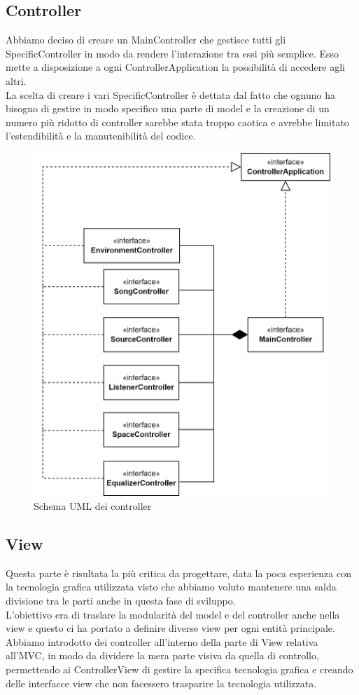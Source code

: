 \documentclass[a4paper,12pt]{report}
\begin{document}
\subsection*{Controller}
Abbiamo deciso di creare un MainController che gestisce tutti gli SpecificController in modo da rendere l'interazione tra essi più semplice. Esso mette a disposizione a ogni ControllerApplication la possibilità di accedere agli altri. 
\\La scelta di creare i vari SpecificController è dettata dal fatto che ognuno ha bisogno di gestire in modo specifico una parte di model e la creazione di un numero più ridotto di controller sarebbe stata troppo caotica e avrebbe limitato l'estendibilità e la manutenibilità del codice.
%
\begin{figure}[H]
\centering{}
\includegraphics[width=\textwidth]{img/architecture/controller.png}
\caption{Schema UML dei controller}
\label{img:analysis}
\end{figure}
%
\subsection*{View}
Questa parte è risultata la più critica da progettare, data la poca esperienza con la tecnologia grafica utilizzata visto che abbiamo voluto mantenere una salda divisione tra le parti anche in questa fase di sviluppo. 
\\L'obiettivo era di traslare la modularità del model e del controller anche nella view e questo ci ha portato a definire diverse view per ogni entità principale. Abbiamo introdotto dei controller all'interno della parte di View relativa all'MVC, in modo da dividere la mera parte visiva da quella di controllo, permettendo ai ControllerView di gestire la specifica tecnologia grafica e creando delle interfacce view che non facessero trasparire la tecnologia utilizzata.
\end{document}
